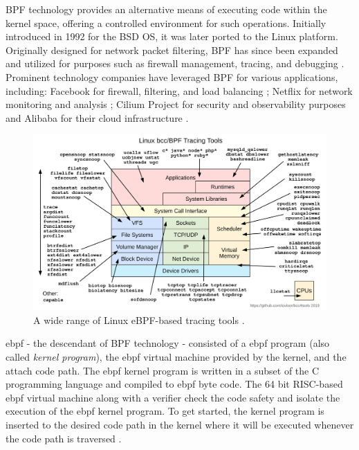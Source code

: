 \ac{BPF} technology provides an alternative means of executing code within the kernel space, offering a controlled environment for such operations. 
Initially introduced in 1992 for the \ac{BSD} OS, it was later ported to the Linux platform. 
Originally designed for network packet filtering, \ac{BPF} has since been expanded and utilized for purposes such as firewall management, tracing, and debugging \cite{McCanne_intro_bpf} \cite{lwn_intro_ebpf}. 
Prominent technology companies have leveraged \ac{BPF} for various applications, including: Facebook for firewall, filtering, and load balancing \cite{facebook_katran_ebpf_2018}; Netflix for network monitoring and analysis \cite{netflix_network_insight}; Cilium Project for security and observability purposes \cite{cilium_io_page} and Alibaba for their cloud infrastructure \cite{alibaba_cloud_ebpf}.

\begin{figure}[H]
    \centering
    \includegraphics[width=1.0\textwidth]{resources/images/bcc_tracing_tools_2019.png}
    \caption{A wide range of Linux eBPF-based tracing tools \cite{iovisor_page}.}\label{fig:approach_design:tracing_tools_linux}
\end{figure}

\ac{ebpf} - the descendant of \ac{BPF} technology - consisted of a \ac{ebpf} program (also called \textit{kernel program}), the \ac{ebpf} virtual machine provided by the kernel, and the attach code path.
The \ac{ebpf} kernel program is written in a subset of the C programming language and compiled to \ac{ebpf} byte code.
The 64 bit \ac{RISC}-based \ac{ebpf} virtual machine along with a verifier check the code safety and isolate the execution of the \ac{ebpf} kernel program.
To get started, the kernel program is inserted to the desired code path in the kernel where it will be executed whenever the code path is traversed \cite{lwn_intro_ebpf}.

